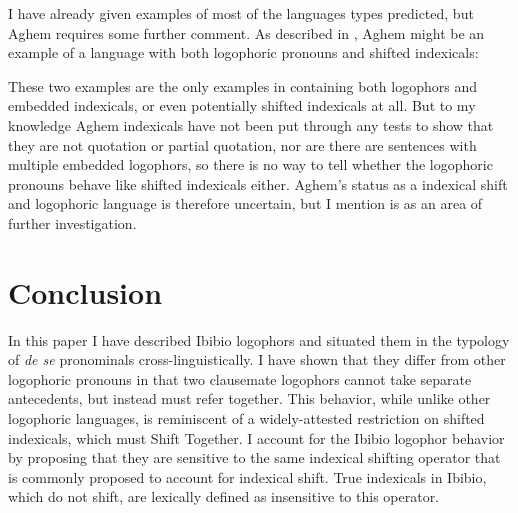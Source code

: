 \documentclass[output=paper]{langscibook}
\begin{document}
I have already given examples of most of the languages types predicted, but Aghem requires some further comment. As described in \citet{Hyman1979}, Aghem might be an example of a language with both logophoric pronouns and shifted indexicals:
\begin{exe}
\ex\label{aghem}
\begin{xlist}%
	
\end{xlist}
\end{exe}
These two examples are the only examples in \citet{Hyman1979} containing both logophors and embedded indexicals, or even potentially shifted indexicals at all. But to my knowledge Aghem indexicals have not been put through any tests to show that they are not quotation or partial quotation, nor are there are sentences with multiple embedded logophors, so there is no way to tell whether the logophoric pronouns behave like shifted indexicals either. Aghem's status as a indexical shift and logophoric language is therefore uncertain, but I mention is as an area of further investigation.




\section{Conclusion}

In this paper I have described Ibibio logophors and situated them in the typology of \textit{de se} pronominals cross-linguistically. I have shown that they differ from other logophoric pronouns in that two clausemate logophors cannot take separate antecedents, but instead must refer together. This behavior, while unlike other logophoric languages, is reminiscent of a widely-attested restriction on shifted indexicals, which must Shift Together. I account for the Ibibio logophor behavior by proposing that they are sensitive to the same indexical shifting operator that is commonly proposed to account for indexical shift. True indexicals in Ibibio, which do not shift, are lexically defined as insensitive to this operator.
 
\end{document}
